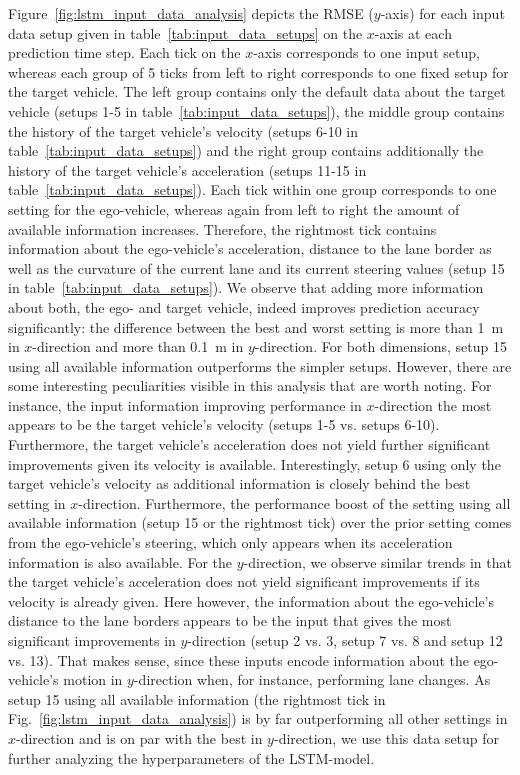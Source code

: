 Figure~\ref{fig:lstm_input_data_analysis} depicts the \ac{RMSE} ($y$-axis) for each input data setup given in table~\ref{tab:input_data_setups} on the $x$-axis at each prediction time step.
Each tick on the $x$-axis corresponds to one input setup, whereas each group of \num{5} ticks from left to right corresponds to one fixed setup for the target vehicle.
The left group contains only the default data about the target vehicle (setups \num{1}-\num{5} in table~\ref{tab:input_data_setups}), the middle group contains the history of the target vehicle's velocity (setups \num{6}-\num{10} in table~\ref{tab:input_data_setups}) and the right group contains additionally the history of the target vehicle's acceleration (setups \num{11}-\num{15} in table~\ref{tab:input_data_setups}).
Each tick within one group corresponds to one setting for the ego-vehicle, whereas again from left to right the amount of available information increases.
Therefore, the rightmost tick contains information about the ego-vehicle's acceleration, distance to the lane border as well as the curvature of the current lane and its current steering values (setup \num{15} in table~\ref{tab:input_data_setups}). 
We observe that adding more information about both, the ego- and target vehicle, indeed improves prediction accuracy significantly: the difference between the best and worst setting is more than \SI{1}{\meter} in $x$-direction and more than \SI{0.1}{\meter} in $y$-direction.
For both dimensions, setup \num{15} using all available information outperforms the simpler setups.
However, there are some interesting peculiarities visible in this analysis that are worth noting.
For instance, the input information improving performance in $x$-direction the most appears to be the target vehicle's velocity (setups \num{1}-\num{5} vs. setups \num{6}-\num{10}). 
Furthermore, the target vehicle's acceleration does not yield further significant improvements given its velocity is available.
Interestingly, setup \num{6} using only the target vehicle's velocity as additional information is closely behind the best setting in $x$-direction.
Furthermore, the performance boost of the setting using all available information (setup \num{15} or the rightmost tick) over the prior setting comes from the ego-vehicle's steering, which only appears when its acceleration information is also available.
For the $y$-direction, we observe similar trends in that the target vehicle's acceleration does not yield significant improvements if its velocity is already given.
Here however, the information about the ego-vehicle's distance to the lane borders appears to be the input that gives the most significant improvements in $y$-direction (setup \num{2} vs. \num{3}, setup \num{7} vs. \num{8} and setup \num{12} vs. \num{13}).
That makes sense, since these inputs encode information about the ego-vehicle's motion in $y$-direction when, for instance, performing lane changes.
As setup \num{15} using all available information (the rightmost tick in Fig.~\ref{fig:lstm_input_data_analysis}) is by far outperforming all other settings in $x$-direction and is on par with the best in $y$-direction, we use this data setup for further analyzing the hyperparameters of the \ac{LSTM}-model.

